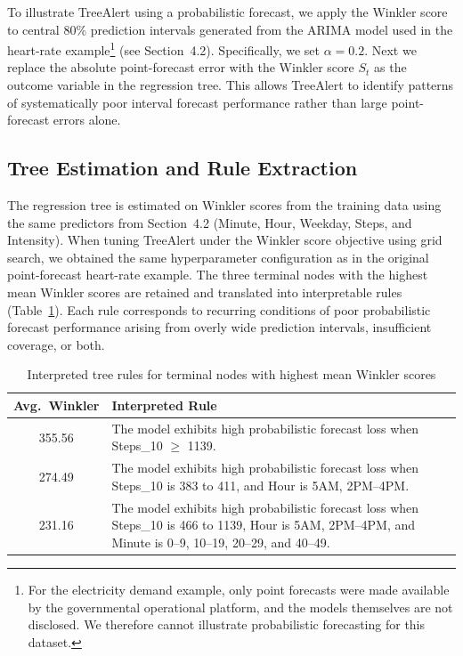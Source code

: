\documentclass[]{interact}
\theoremstyle{plain}
\theoremstyle{definition}
\theoremstyle{remark}
\begin{document}
To illustrate TreeAlert using a probabilistic forecast, we apply the Winkler score to
central 80\% prediction intervals generated from the ARIMA model used in the heart-rate
example\footnote{For the electricity demand example, only point forecasts were made available
by the governmental operational platform, and the models themselves are not disclosed. We
therefore cannot illustrate probabilistic forecasting for this dataset.} (see
Section~4.2). Specifically, we set $\alpha=0.2$. Next we replace the absolute
point-forecast error with the Winkler score $S_t$ as the outcome variable in the regression
tree. This allows TreeAlert to identify patterns of systematically poor interval forecast
performance rather than large point-forecast errors alone.

\subsection*{Tree Estimation and Rule Extraction}

The regression tree is estimated on Winkler scores from the training data using the same
predictors from Section~4.2 (Minute, Hour, Weekday, Steps, and Intensity). When tuning
TreeAlert under the Winkler score objective using grid search, we obtained the same
hyperparameter configuration as in the original point-forecast heart-rate example. The three
terminal nodes with the highest mean Winkler scores are retained and translated into
interpretable rules (Table~\ref{tab:winkler_rules}). Each rule corresponds to recurring
conditions of poor probabilistic forecast performance arising from overly wide prediction
intervals, insufficient coverage, or both.

\begin{table}[ht]
\centering
\caption{Interpreted tree rules for terminal nodes with highest mean Winkler scores}
\label{tab:winkler_rules}
\small
\begin{tabular}{c p{12.5cm}}
\hline
\textbf{Avg.~Winkler} & \textbf{Interpreted Rule} \\
\hline
355.56 & The model exhibits high probabilistic forecast loss when Steps\_10 $\geq$ 1139. \\
274.49 & The model exhibits high probabilistic forecast loss when Steps\_10 is 383 to 411, and Hour is 5AM, 2PM--4PM. \\
231.16 & The model exhibits high probabilistic forecast loss when Steps\_10 is 466 to 1139, Hour is 5AM, 2PM--4PM, and Minute is 0--9, 10--19, 20--29, and 40--49. \\
\hline
\end{tabular}
\end{table}
\end{document}
